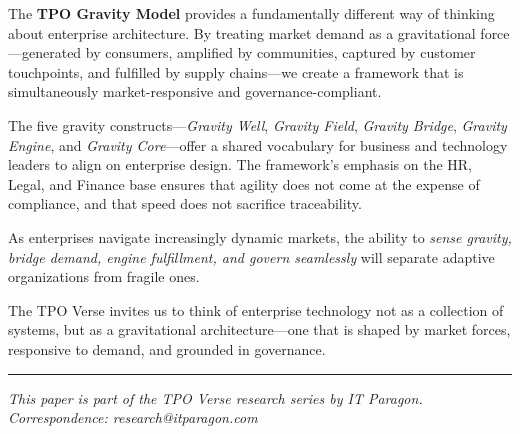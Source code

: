 \documentclass[11pt,a4paper,twocolumn]{article}
\begin{document}
The \textbf{TPO Gravity Model} provides a fundamentally different way of thinking about enterprise architecture. By treating market demand as a gravitational force---generated by consumers, amplified by communities, captured by customer touchpoints, and fulfilled by supply chains---we create a framework that is simultaneously market-responsive and governance-compliant.

The five gravity constructs---\textit{Gravity Well}, \textit{Gravity Field}, \textit{Gravity Bridge}, \textit{Gravity Engine}, and \textit{Gravity Core}---offer a shared vocabulary for business and technology leaders to align on enterprise design. The framework's emphasis on the HR, Legal, and Finance base ensures that agility does not come at the expense of compliance, and that speed does not sacrifice traceability.

As enterprises navigate increasingly dynamic markets, the ability to \textit{sense gravity, bridge demand, engine fulfillment, and govern seamlessly} will separate adaptive organizations from fragile ones.

The TPO Verse invites us to think of enterprise technology not as a collection of systems, but as a gravitational architecture---one that is shaped by market forces, responsive to demand, and grounded in governance.

\vspace{12pt}
\noindent\rule{\columnwidth}{0.3pt}
\vspace{6pt}
{\footnotesize\textcolor{gravitySlate}{\textit{This paper is part of the TPO Verse research series by IT Paragon. Correspondence: research@itparagon.com}}}
\end{document}
